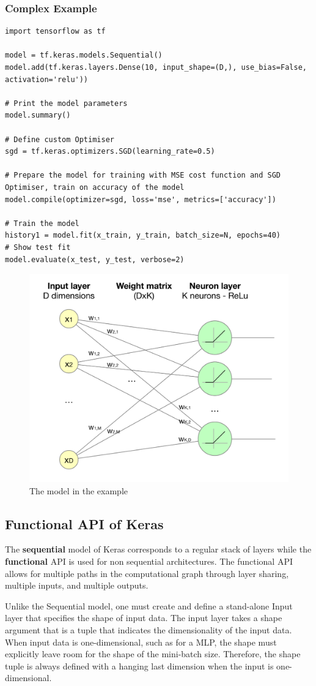 \documentclass[11pt]{article}
\begin{document}
\subsubsection{Complex Example}
\begin{verbatim}
import tensorflow as tf

model = tf.keras.models.Sequential()
model.add(tf.keras.layers.Dense(10, input_shape=(D,), use_bias=False, activation='relu'))

# Print the model parameters
model.summary()

# Define custom Optimiser
sgd = tf.keras.optimizers.SGD(learning_rate=0.5)

# Prepare the model for training with MSE cost function and SGD Optimiser, train on accuracy of the model
model.compile(optimizer=sgd, loss='mse', metrics=['accuracy'])

# Train the model
history1 = model.fit(x_train, y_train, batch_size=N, epochs=40)
# Show test fit
model.evaluate(x_test, y_test, verbose=2)
\end{verbatim}

\begin{figure}[tbh]
	\centering
	\includegraphics[width=0.5\linewidth,keepaspectratio]{keras_model_example}
	\caption{The model in the example}
	\label{fig:kerasmodelexample}
\end{figure}

\subsection{Functional API of Keras}
The \textbf{sequential} model of Keras corresponds to a regular stack of layers while the \textbf{functional} API is used for non sequential architectures. The functional API allows for multiple paths in the computational graph through layer sharing, multiple inputs, and multiple outputs.

Unlike the Sequential model, one must create and define a stand-alone Input layer that specifies the shape of input data. The input layer takes a shape argument that is a tuple that indicates the dimensionality of the input data. When input data is one-dimensional, such as for a MLP, the shape must explicitly leave room for the shape of the mini-batch size. Therefore, the shape tuple is always defined with a hanging last dimension when the input is one-dimensional. 
\end{document}
